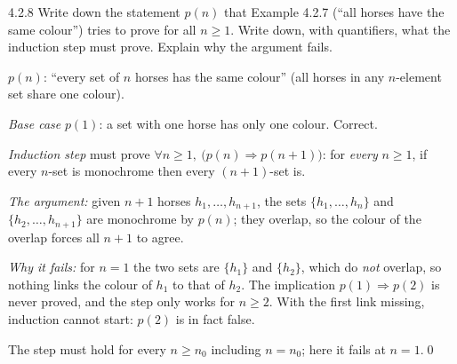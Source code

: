 \begin{bookex}[recommended]{4.2.8}
Write down the statement $p(n)$ that Example 4.2.7 (``all horses have the same colour'') tries to prove for all $n\ge1$. Write down, with quantifiers, what the induction step must prove. Explain why the argument fails.
\solution
\begin{steps}
\item $p(n)$: ``every set of $n$ horses has the same colour'' (all horses in any $n$-element set share one colour).
\item \emph{Base case} $p(1)$: a set with one horse has only one colour. Correct.
\item \emph{Induction step} must prove $\forall n\ge1,\ \big(p(n)\Rightarrow p(n+1)\big)$: for \emph{every} $n\ge1$, if every $n$-set is monochrome then every $(n+1)$-set is.
\item \emph{The argument:} given $n+1$ horses $h_1,\dots,h_{n+1}$, the sets $\{h_1,\dots,h_n\}$ and $\{h_2,\dots,h_{n+1}\}$ are monochrome by $p(n)$; they overlap, so the colour of the overlap forces all $n+1$ to agree.
\item \emph{Why it fails:} for $n=1$ the two sets are $\{h_1\}$ and $\{h_2\}$, which do \emph{not} overlap, so nothing links the colour of $h_1$ to that of $h_2$. The implication $p(1)\Rightarrow p(2)$ is never proved, and the step only works for $n\ge2$. With the first link missing, induction cannot start: $p(2)$ is in fact false.
\end{steps}
\conclusion The step must hold for every $n\ge n_0$ including $n=n_0$; here it fails at $n=1$.\qed
\end{bookex}

